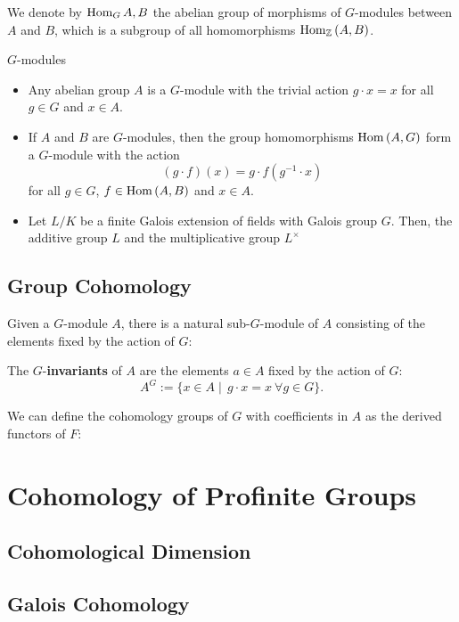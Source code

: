 \documentclass[a4paper, oneside]{memoir}
\begin{document}
We denote by $\operatorname{Hom}_G{A,B}$ the abelian group of morphisms of $G$-modules between $A$ and $B$, which is a subgroup of all homomorphisms $\operatorname{Hom}_{\mathbb{Z}}{(A,B)}$.

\begin{example}{$G$-modules}\
    \begin{itemize}
        \item Any abelian group $A$ is a $G$-module with the trivial action $g\cdot x=x$ for all $g\in G$ and $x\in A$.
        \item If $A$ and $B$ are $G$-modules, then the group homomorphisms $\operatorname{Hom}{(A,G)}$ form a $G$-module with the action
              \[
                  (g\cdot f)(x)=g\cdot f(g^{-1}\cdot x)
              \]
              for all $g\in G$, $f\in\operatorname{Hom}{(A,B)}$ and $x\in A$.
        \item Let $L / K$ be a finite Galois extension of fields with Galois group $G$. Then, the additive group $L$ and the multiplicative group $L^\times$
    \end{itemize}
\end{example}

\section{Group Cohomology}

Given a $G$-module $A$, there is a natural sub-$G$-module of $A$ consisting of the elements fixed by the action of $G$:

\begin{definition}
    The $G$-\textbf{invariants} of $A$ are the elements $a \in A$ fixed by the action of $G$:
    \[
        A^G:=\{x\in A\mid\, g\cdot x=x ~ \forall g\in G\}.
    \]
\end{definition}

We can define the cohomology groups of $G$ with coefficients in $A$ as the derived functors of $F$:

\chapter{Cohomology of Profinite Groups}

\section{Cohomological Dimension}
\section{Galois Cohomology}
\end{document}
